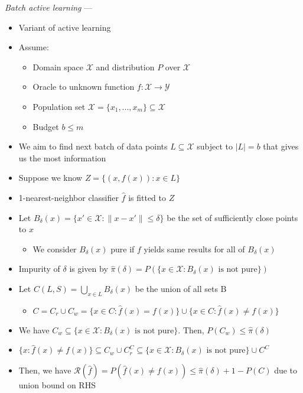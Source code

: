 \emph{Batch active learning} ---
\begin{itemize}
    \item Variant of active learning
    \item Assume:
    \begin{itemize}
        \item Domain space $\mathcal{X}$ and distribution $P$ over $\mathcal{X}$
        \item Oracle to unknown function $f: \mathcal{X} \rightarrow \mathcal{Y}$
        \item Population set $\mathcal{X} = \{x_1, ..., x_m\} \subseteq \mathcal{X}$
        \item Budget $b \leq m$
    \end{itemize}
    \item We aim to find next batch of data points $L \subseteq \mathcal{X}$ subject to $|L| = b$ that gives us the most information
    \item Suppose we know $Z = \{ (x,f(x)): x \in L \}$
    \item 1-nearest-neighbor classifier $\hat{f}$ is fitted to $Z$
    \item Let $B_\delta(x) = \{ x' \in \mathcal{X}: \| x - x' \| \leq \delta \}$ be the set of sufficiently close points to $x$
    \begin{itemize}
        \item We consider $B_\delta(x)$ pure if $f$ yields same results for all of $B_\delta(x)$
    \end{itemize}
    \item Impurity of $\delta$ is given by $\hat{\pi}(\delta) = P(\{{x \in \mathcal{X}: B_\delta(x) \textrm{ is not pure}}\})$
    \item Let  $C(L,S) = \bigcup_{x \in L} B_\delta(x)$ be the union of all sets B
    \begin{itemize}
        \item $C = C_r \cup C_w = \{x \in C: \hat{f}(x) = f(x)\} \cup \{x \in C: \hat{f}(x) \neq f(x)\}$
    \end{itemize}
    \item We have $C_w \subseteq \{{x \in \mathcal{X}: B_\delta(x) \textrm{ is not pure}}\}$. Then, $P(C_w) \leq \hat{\pi}(\delta)$
    \item $\{x: \hat{f}(x) \neq f(x)\} \subseteq C_w \cup C_r^C \subseteq \{{x \in \mathcal{X}: B_\delta(x) \textrm{ is not pure}}\} \cup C^C$
    \item Then, we have $\mathcal{R}(\hat{f}) = P(\hat{f}(x) \neq f(x)) \leq \hat{\pi}(\delta) + 1-P(C)$ due to union bound on RHS

\end{itemize}
